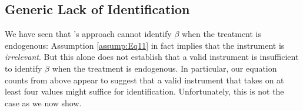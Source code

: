 

\subsection{Generic Lack of Identification}
We have seen that \cite{Mahajan}'s approach cannot identify $\beta$ when the treatment is endogenous: Assumption \ref{assump:Eq11} in fact implies that the instrument is \emph{irrelevant}. 
But this alone does not establish that a valid instrument is insufficient to identify $\beta$ when the treatment is endogenous.
In particular, our equation counts from above appear to suggest that a valid instrument that takes on at least four values might suffice for identification.
Unfortunately, this is not the case as we now show.


